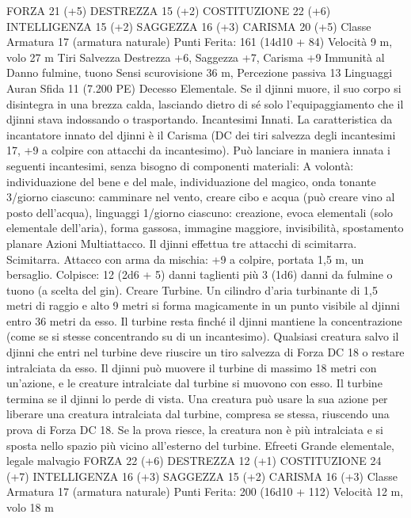 \begin{multicols}{2}
FORZA 21 (+5)
DESTREZZA 15 (+2)
COSTITUZIONE 22 (+6)
INTELLIGENZA 15 (+2)
SAGGEZZA 16 (+3)
CARISMA 20 (+5)
Classe Armatura 17 (armatura naturale)
\hspace*{0pt}\hfill{Punti Ferita}: 161 (14d10 + 84)
Velocità 9 m, volo 27 m
Tiri Salvezza Destrezza +6, Saggezza +7, Carisma +9
Immunità al Danno fulmine, tuono
Sensi scurovisione 36 m, Percezione passiva 13
Linguaggi Auran
Sfida 11 (7.200 PE)
Decesso Elementale. Se il djinni muore, il suo corpo si
disintegra in una brezza calda, lasciando dietro di sé solo
l’equipaggiamento che il djinni stava indossando o trasportando.
Incantesimi Innati. La caratteristica da incantatore innato del
djinni è il Carisma (DC dei tiri salvezza degli incantesimi 17, +9
a colpire con attacchi da incantesimo). Può lanciare in maniera
innata i seguenti incantesimi, senza bisogno di componenti
materiali:
A volontà: individuazione del bene e del male, individuazione del
magico, onda tonante
3/giorno ciascuno: camminare nel vento, creare cibo e acqua
(può creare vino al posto dell’acqua), linguaggi
1/giorno ciascuno: creazione, evoca elementali (solo elementale
dell’aria), forma gassosa, immagine maggiore, invisibilità,
spostamento planare
Azioni
Multiattacco. Il djinni effettua tre attacchi di scimitarra.
Scimitarra. Attacco con arma da mischia: +9 a colpire, portata
1,5 m, un bersaglio.
Colpisce: 12 (2d6 + 5) danni taglienti più 3 (1d6) danni da
fulmine o tuono (a scelta del gin).
Creare Turbine. Un cilindro d’aria turbinante di 1,5 metri di
raggio e alto 9 metri si forma magicamente in un punto visibile al
djinni entro 36 metri da esso. Il turbine resta finché il djinni
mantiene la concentrazione (come se si stesse concentrando su di
un incantesimo). Qualsiasi creatura salvo il djinni che entri nel
turbine deve riuscire un tiro salvezza di Forza DC 18 o restare
intralciata da esso. Il djinni può muovere il turbine di massimo
18 metri con un’azione, e le creature intralciate dal turbine si
muovono con esso. Il turbine termina se il djinni lo perde di
vista.
Una creatura può usare la sua azione per liberare una creatura
intralciata dal turbine, compresa se stessa, riuscendo una prova di
Forza DC 18. Se la prova riesce, la creatura non è più intralciata
e si sposta nello spazio più vicino all’esterno del turbine.
Efreeti
Grande elementale, legale malvagio
FORZA 22 (+6)
DESTREZZA 12 (+1)
COSTITUZIONE 24 (+7)
INTELLIGENZA 16 (+3)
SAGGEZZA 15 (+2)
CARISMA 16 (+3)
Classe Armatura 17 (armatura naturale)
\hspace*{0pt}\hfill{Punti Ferita}: 200 (16d10 + 112)
Velocità 12 m, volo 18 m

\end{multicols}
